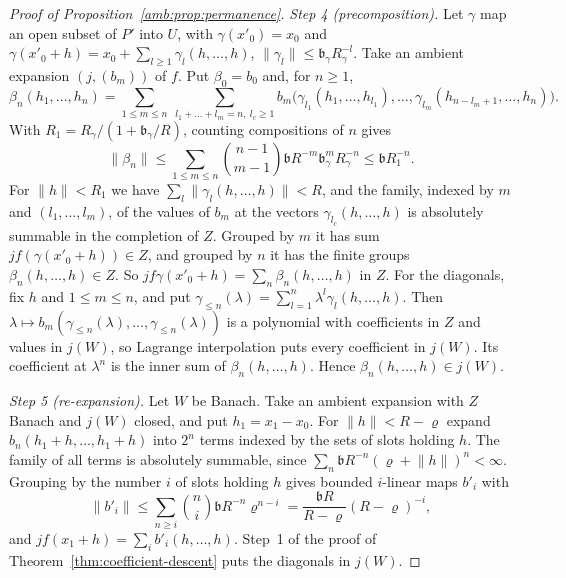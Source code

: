 \documentclass[11pt]{amsart}
\theoremstyle{definition}
\theoremstyle{remark}
\numberwithin{equation}{section}
\newcommand{\norm}[1]{\lVert #1\rVert}
\theoremstyle{plain}
\theoremstyle{definition}
\theoremstyle{plain}
\begin{document}
\begin{proof}[Proof of Proposition~\ref{amb:prop:permanence}]
\emph{Step 4 (precomposition).} Let $\gamma$ map an open subset of $P'$ into $U$, with $\gamma(x'_0)=x_0$ and $\gamma(x'_0+h)=x_0+\sum_{l\ge1}\gamma_l(h,\dots,h)$, $\norm{\gamma_l}\le \mathfrak b_\gamma R_\gamma^{-l}$. Take an ambient expansion $(j,(b_m))$ of $f$. Put $\beta_0=b_0$ and, for $n\ge1$,
\[
 \beta_n(h_1,\dots,h_n)=\sum_{1\le m\le n}\ \sum_{l_1+\dots+l_m=n,\ l_c\ge1}b_m\bigl(\gamma_{l_1}(h_1,\dots,h_{l_1}),\dots,\gamma_{l_m}(h_{n-l_m+1},\dots,h_n)\bigr).
\]
With $R_1=R_\gamma/(1+\mathfrak b_\gamma/R)$, counting compositions of $n$ gives
\[
 \norm{\beta_n}\le\sum_{1\le m\le n}\binom{n-1}{m-1}\mathfrak bR^{-m}\mathfrak b_\gamma^mR_\gamma^{-n}\le \mathfrak bR_1^{-n}.
\]
For $\norm h<R_1$ we have $\sum_l\norm{\gamma_l(h,\dots,h)}<R$, and the family, indexed by $m$ and $(l_1,\dots,l_m)$, of the values of $b_m$ at the vectors $\gamma_{l_c}(h,\dots,h)$ is absolutely summable in the completion of $Z$. Grouped by $m$ it has sum $jf(\gamma(x'_0+h))\in Z$, and grouped by $n$ it has the finite groups $\beta_n(h,\dots,h)\in Z$. So $jf\gamma(x'_0+h)=\sum_n\beta_n(h,\dots,h)$ in $Z$. For the diagonals, fix $h$ and $1\le m\le n$, and put $\gamma_{\le n}(\lambda)=\sum_{l=1}^n\lambda^l\gamma_l(h,\dots,h)$. Then $\lambda\mapsto b_m(\gamma_{\le n}(\lambda),\dots,\gamma_{\le n}(\lambda))$ is a polynomial with coefficients in $Z$ and values in $j(W)$, so Lagrange interpolation puts every coefficient in $j(W)$. Its coefficient at $\lambda^n$ is the inner sum of $\beta_n(h,\dots,h)$. Hence $\beta_n(h,\dots,h)\in j(W)$.

\emph{Step 5 (re-expansion).} Let $W$ be Banach. Take an ambient expansion with $Z$ Banach and $j(W)$ closed, and put $h_1=x_1-x_0$. For $\norm h<R-\varrho$ expand $b_n(h_1+h,\dots,h_1+h)$ into $2^n$ terms indexed by the sets of slots holding $h$. The family of all terms is absolutely summable, since $\sum_n\mathfrak bR^{-n}(\varrho+\norm h)^n<\infty$. Grouping by the number $i$ of slots holding $h$ gives bounded $i$\nobreakdash-linear maps $b'_i$ with
\[
 \norm{b'_i}\le\sum_{n\ge i}\binom ni\mathfrak bR^{-n}\varrho^{n-i}=\frac{\mathfrak bR}{R-\varrho}(R-\varrho)^{-i},
\]
and $jf(x_1+h)=\sum_ib'_i(h,\dots,h)$. Step~1 of the proof of Theorem~\ref{thm:coefficient-descent} puts the diagonals in $j(W)$.


\end{proof}
\end{document}
